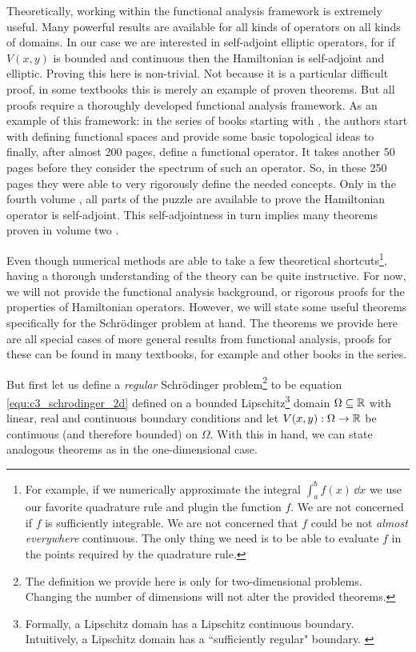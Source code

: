Theoretically, working within the functional analysis framework is extremely useful. Many powerful results are available for all kinds of operators on all kinds of domains. In our case we are interested in self-adjoint elliptic operators, for if $V(x, y)$ is bounded and continuous then the Hamiltonian is self-adjoint and elliptic. Proving this here is non-trivial. Not because it is a particular difficult proof, in some textbooks this is merely an example of proven theorems. But all proofs require a thoroughly developed functional analysis framework. As an example of this framework: in the series of books starting with \cite{reed_functional_1980}, the authors start with defining functional spaces and provide some basic topological ideas to finally, after almost 200 pages, define a functional operator. It takes another 50 pages before they consider the spectrum of such an operator. So, in these 250 pages they were able to very rigorously define the needed concepts. Only in the fourth volume \cite{reed_iv_1978}, all parts of the puzzle are available to prove the Hamiltonian operator is self-adjoint. This self-adjointness in turn implies many theorems proven in volume two \cite{reed_ii_1975}.

Even though numerical methods are able to take a few theoretical shortcuts\footnote{For example, if we numerically approximate the integral $\int_a^b f(x)\,\dd x$ we use our favorite quadrature rule and plugin the function $f$. We are not concerned if $f$ is sufficiently integrable. We are not concerned that $f$ could be not \emph{almost everywhere} continuous. The only thing we need is to be able to evaluate $f$ in the points required by the quadrature rule.}, having a thorough understanding of the theory can be quite instructive. For now, we will not provide the functional analysis background, or rigorous proofs for the properties of Hamiltonian operators. However, we will state some useful theorems specifically for the Schrödinger problem at hand. The theorems we provide here are all special cases of more general results from functional analysis, proofs for these can be found in many textbooks, for example \cite{reed_functional_1980} and other books in the series.

But first let us define a \emph{regular} Schrödinger problem\footnote{The definition we provide here is only for two-dimensional problems. Changing the number of dimensions will not alter the provided theorems.} to be equation \eqref{equ:c3_schrodinger_2d} defined on a bounded Lipschitz\footnote{Formally, a Lipschitz domain has a Lipschitz continuous boundary. Intuitively, a Lipschitz domain has a ``sufficiently regular" boundary. \cite{dacorogna_introduction_2008}} domain $\Omega \subseteq \mathbb{R}$ with linear, real and continuous boundary conditions and let $V(x, y) : \Omega \to \mathbb{R}$ be continuous (and therefore bounded) on $\Omega$. With this in hand, we can state analogous theorems as in the one-dimensional case.


